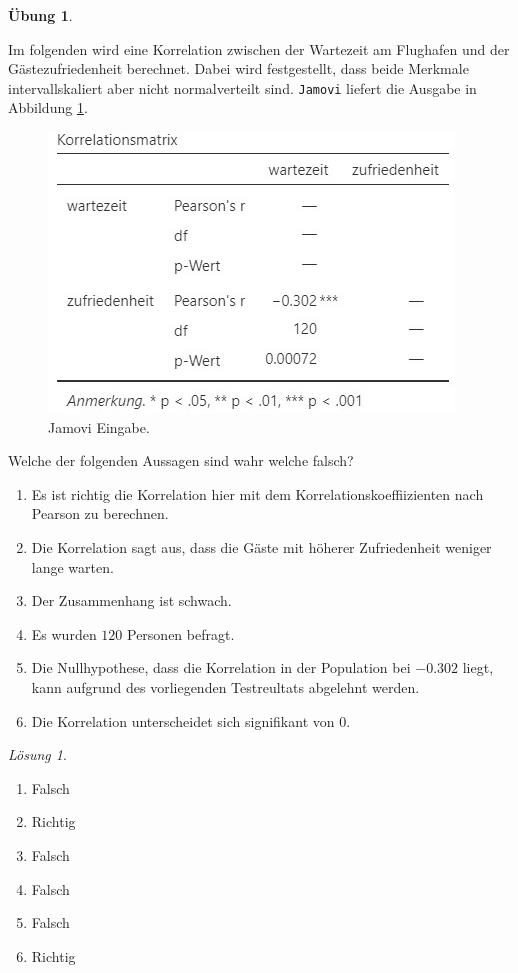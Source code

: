 \documentclass[
]{book}
\providecommand{\tightlist}{%
  \setlength{\itemsep}{0pt}\setlength{\parskip}{0pt}}
\theoremstyle{definition}
\theoremstyle{definition}
\theoremstyle{definition}
\newtheorem{exercise}{Übung}[chapter]
\theoremstyle{definition}
\theoremstyle{remark}
\newtheorem*{solution}{Lösung}
\begin{document}
\begin{exercise}
\protect\hypertarget{exr:test-spearman}{}\label{exr:test-spearman}\leavevmode

Im folgenden wird eine Korrelation zwischen der Wartezeit am Flughafen und der Gästezufriedenheit berechnet. Dabei wird festgestellt, dass beide Merkmale intervallskaliert aber nicht normalverteilt sind. \texttt{Jamovi} liefert die Ausgabe in Abbildung \ref{fig:sol-test-spearman-output}.

\begin{figure}

{\centering \includegraphics[width=0.5\linewidth]{figures/08-exr-test-spearman-jmv-output} 

}

\caption{Jamovi Eingabe.}\label{fig:sol-test-spearman-output}
\end{figure}

Welche der folgenden Aussagen sind wahr welche falsch?

\begin{enumerate}
\def\labelenumi{\alph{enumi})}
\tightlist
\item
  Es ist richtig die Korrelation hier mit dem Korrelationskoeffiizienten nach Pearson zu berechnen.
\item
  Die Korrelation sagt aus, dass die Gäste mit höherer Zufriedenheit weniger lange warten.
\item
  Der Zusammenhang ist schwach.
\item
  Es wurden \(120\) Personen befragt.
\item
  Die Nullhypothese, dass die Korrelation in der Population bei \(-0.302\) liegt, kann aufgrund des vorliegenden Testreultats abgelehnt werden.
\item
  Die Korrelation unterscheidet sich signifikant von \(0\).
\end{enumerate}

\end{exercise}

\begin{solution}
\leavevmode

\begin{enumerate}
\def\labelenumi{\alph{enumi})}
\tightlist
\item
  Falsch
\item
  Richtig
\item
  Falsch
\item
  Falsch
\item
  Falsch
\item
  Richtig
\end{enumerate}

\end{solution}
\end{document}
